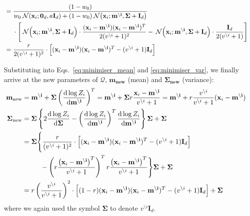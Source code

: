 \documentclass[11pt]{article}
\newcommand{\vek}[1]{\ensuremath{\mathbf{#1}}}
\newcommand{\kve}{\ensuremath{\mathcal{Q}}}
\newcommand{\byd}{\ensuremath{\mathrm{d}}}
\newcommand{\norm}{\ensuremath{\:\mathcal{N}}}
\newcommand{\unity}{\ensuremath{\mathbf{I}}}
\begin{document}
\begin{align}
			&=
			\frac{(1 - w_0)
				}
			{w_0  \norm(\vek{x}_i; \vek{0}_d, a\unity_{d})
			+  (1 - w_0)\norm\!\left(\vek{x}_i; \vek{m^{\setminus i}}, \vek{\Sigma} + \unity_d\right)
			}\notag\\
			&\hphantom{=|}\mbox{}\cdot\Bigg[
				\norm\!\left(\vek{x}_i; \vek{m^{\setminus i}}, \vek{\Sigma} + \unity_d\right)
				\cdot\frac{(\vek{x}_i - \vek{m^{\setminus i}})(\vek{x}_i 
				- \vek{m^{\setminus i}})^T}{2(v^{\setminus i} + 1)^2}
				- \norm\!\left(\vek{x}_i; \vek{m^{\setminus i}}, \vek{\Sigma} + \unity_d\right)
				\cdot\frac{\unity_d}{2(v^{\setminus i} + 1)}
				\Bigg]\\
			&= \frac{r}{2(v^{\setminus i} + 1)^2}\cdot\left[
				(\vek{x}_i - \vek{m^{\setminus i}})(\vek{x}_i - \vek{m^{\setminus i}})^T
				- (v^{\setminus i} + 1)\unity_d
			\right]
\end{align}

Substituting into Eqs.~\eqref{eq:minimiser_mean} and 
\eqref{eq:minimiser_var}, we finally arrive at the new parameters of 
$\kve$, $\vek{m_{\text{new}}}$ (mean) and 
$\vek{\Sigma_{\text{new}}}$ (variance):
\begin{align}
	 \vek{m_{\text{new}}} &= \vek{m^{\setminus i}} + \vek{\Sigma}
							\left(\frac{\byd \log Z_i}
									 {\byd \vek{m^{\setminus i}}}\right)^T
	         = \vek{m^{\setminus i}} + \vek{\Sigma}
							r\frac{\vek{x}_i - \vek{m^{\setminus i}}}
										{v^{\setminus i} + 1}
	         = \vek{m^{\setminus i}}
					 		+ r\frac{v^{\setminus i}}{v^{\setminus i} + 1}
							  (\vek{x}_i - \vek{m^{\setminus i}})
					\label{eq:mnew}
					\\
	 \vek{\Sigma_{\text{new}}} &=
		\vek{\Sigma}\left\{
		2\frac{\byd\log Z_i}{\byd \vek{\Sigma}}
			- \left(\frac{\byd\log Z_i}{\byd\vek{m^{\setminus i}}}\right)^T
				\frac{\byd\log Z_i}{\byd\vek{m^{\setminus i}}}\right\}\vek{\Sigma}
			+ \vek{\Sigma} \\
		&=
		\vek{\Sigma}\Bigg\{
			\frac{r}{(v^{\setminus i} + 1)^2}\cdot\left[
				(\vek{x}_i - \vek{m^{\setminus i}})(\vek{x}_i - \vek{m^{\setminus i}})^T
				- (v^{\setminus i} + 1)\unity_d
			\right]\notag\\
		&\hphantom{=\vek{\Sigma}\Bigg\{}\mbox{}
			- \left(r\frac{\left(\vek{x}_i - \vek{m^{\setminus i}}\right)^T}
					{v^{\setminus i} + 1}\right)^T
			r\frac{\left(\vek{x}_i - \vek{m^{\setminus i}}\right)^T}
					{v^{\setminus i} + 1}
				\Bigg\}\vek{\Sigma}
			+ \vek{\Sigma} \\
		&=
			r\left(\frac{v^{\setminus i}}{v^{\setminus i} + 1}\right)^2
			\cdot\left[
				(1 - r)(\vek{x}_i - \vek{m^{\setminus i}})(\vek{x}_i - \vek{m^{\setminus i}})^T
				- (v^{\setminus i} + 1)\unity_d
			\right]
			+ \vek{\Sigma}
			\label{eq:sigma_new}
\end{align}
where we again used the symbol $\vek{\Sigma}$ to denote $v^{\setminus 
i}\unity_d$.
\end{document}
